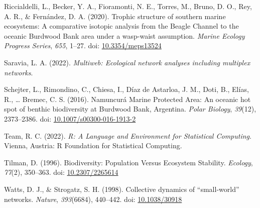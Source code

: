\documentclass[preprint, 3p,
authoryear]{elsarticle} %
\newlength{\cslhangindent}
\newlength{\cslentryspacingunit} %
\newenvironment{CSLReferences}[2] %
 {%
  \setlength{\parindent}{0pt}
  \ifodd #1
  \let\oldpar\par
  \def\par{\hangindent=\cslhangindent\oldpar}
  \fi
  \setlength{\parskip}{#2\cslentryspacingunit}
 }%
 {}
\begin{document}
\begin{CSLReferences}{1}{0}
\leavevmode{}%
Riccialdelli, L., Becker, Y. A., Fioramonti, N. E., Torres, M., Bruno,
D. O., Rey, A. R., \& Fernández, D. A. (2020). Trophic structure of
southern marine ecosystems: A comparative isotopic analysis from the
{Beagle Channel} to the oceanic {Burdwood Bank} area under a wasp-waist
assumption. \emph{Marine Ecology Progress Series}, \emph{655}, 1--27.
doi: \href{https://doi.org/10.3354/meps13524}{10.3354/meps13524}

\leavevmode{}%
Saravia, L. A. (2022). \emph{Multiweb: {Ecological} network analyses
including multiplex networks}.

\leavevmode{}%
Schejter, L., Rimondino, C., Chiesa, I., Díaz de Astarloa, J. M., Doti,
B., Elías, R., \ldots{} Bremec, C. S. (2016). Namuncurá {Marine
Protected Area}: An oceanic hot spot of benthic biodiversity at
{Burdwood Bank}, {Argentina}. \emph{Polar Biology}, \emph{39}(12),
2373--2386. doi:
\href{https://doi.org/10.1007/s00300-016-1913-2}{10.1007/s00300-016-1913-2}

\leavevmode{}%
Team, R. C. (2022). \emph{R: {A Language} and {Environment} for
{Statistical Computing}}. {Vienna, Austria}: R Foundation for
Statistical Computing.

\leavevmode{}%
Tilman, D. (1996). Biodiversity: {Population Versus Ecosystem
Stability}. \emph{Ecology}, \emph{77}(2), 350--363. doi:
\href{https://doi.org/10.2307/2265614}{10.2307/2265614}

\leavevmode{}%
Watts, D. J., \& Strogatz, S. H. (1998). Collective dynamics of
{``small-world''} networks. \emph{Nature}, \emph{393}(6684), 440--442.
doi: \href{https://doi.org/10.1038/30918}{10.1038/30918}

\end{CSLReferences}
\end{document}
